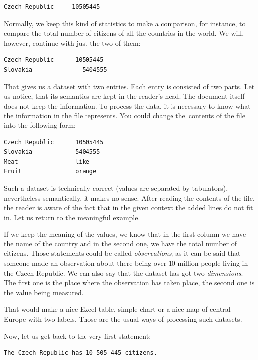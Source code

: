 \begin{verbatim}
Czech Republic     10505445
\end{verbatim}

Normally, we keep this kind of statistics to make a comparison, 
for instance, to compare the total number of citizens of all the countries in the world.
We will, however, continue with just the two of them:

\begin{verbatim}
Czech Republic	    10505445
Slovakia	          5404555
\end{verbatim}

That gives us a dataset with two entries. Each entry is consisted of two parts. Let us notice, that 
its semantics are kept in the reader's head. The document itself does not keep the information.
To process the data, it is necessary to know what the information in the file represents. You could change
the~contents of the file into the following form:

\begin{verbatim}
Czech Republic      10505445
Slovakia            5404555
Meat                like
Fruit               orange
\end{verbatim}

Such a dataset is technically correct (values are separated by tabulators), nevertheless 
semantically, it makes no sense. After reading the contents of the file, the reader 
is aware of the fact that in the given context the added lines do not fit in.
Let us return to the meaningful example.

If we keep the meaning of the values, we know that in the first column we have the name
of the country and in the second one, we have the total number of citizens. Those statements
could be called \emph{observations}, as it can be said that someone made an observation 
about there being over 10 million people living in the Czech Republic. We can also say that the
dataset has got two \emph{dimensions}. The first one is the place where the observation has taken
place, the second one is the value being measured.

That would make a nice Excel table, simple chart or a nice map of central Europe with
two labels. Those are the usual ways of processing such datasets.

Now, let us get back to the very first statement:

\begin{verbatim}
The Czech Republic has 10 505 445 citizens.
\end{verbatim}

